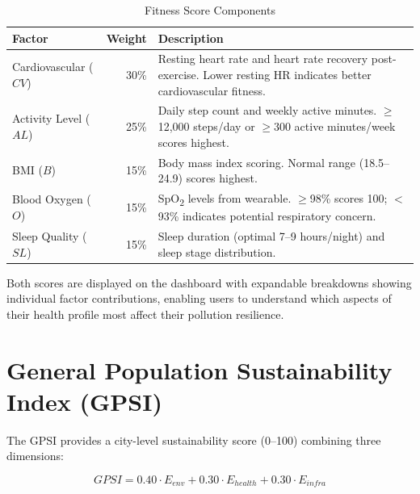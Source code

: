 \documentclass[12pt,a4paper]{report}
\begin{document}
\begin{table}[H]
\centering
\caption{Fitness Score Components}
\label{tab:fitness_factors}
\begin{tabularx}{\textwidth}{lrX}
\toprule
\textbf{Factor} & \textbf{Weight} & \textbf{Description} \\
\midrule
Cardiovascular ($CV$) & 30\% & Resting heart rate and heart rate recovery post-exercise. Lower resting HR indicates better cardiovascular fitness. \\
Activity Level ($AL$) & 25\% & Daily step count and weekly active minutes. $\geq$12,000 steps/day or $\geq$300 active minutes/week scores highest. \\
BMI ($B$)             & 15\% & Body mass index scoring. Normal range (18.5--24.9) scores highest. \\
Blood Oxygen ($O$)    & 15\% & SpO\textsubscript{2} levels from wearable. $\geq$98\% scores 100; $<$93\% indicates potential respiratory concern. \\
Sleep Quality ($SL$)  & 15\% & Sleep duration (optimal 7--9 hours/night) and sleep stage distribution. \\
\bottomrule
\end{tabularx}
\end{table}

Both scores are displayed on the dashboard with expandable breakdowns showing individual factor contributions, enabling users to understand which aspects of their health profile most affect their pollution resilience.

\section{General Population Sustainability Index (GPSI)}

The GPSI provides a city-level sustainability score (0--100) combining three dimensions:

\begin{equation}
  GPSI = 0.40 \cdot E_{env} + 0.30 \cdot E_{health} + 0.30 \cdot E_{infra}
  \label{eq:gpsi}
\end{equation}
\end{document}
